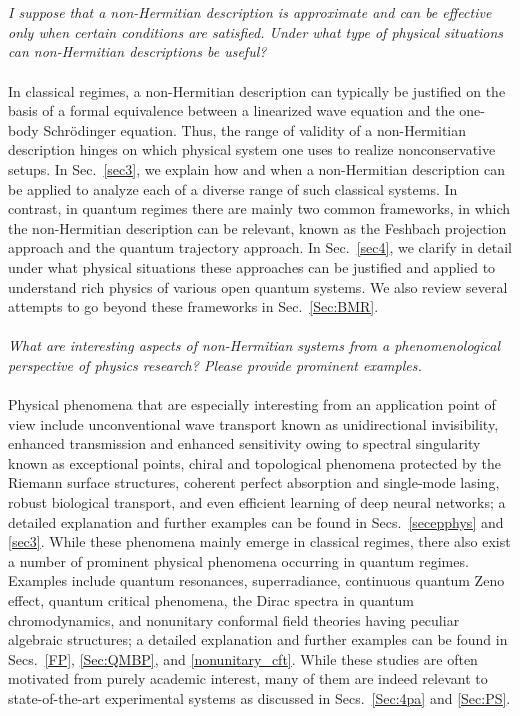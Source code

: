 \documentclass{tADP2e}
\theoremstyle{plain}
\theoremstyle{plain}
\theoremstyle{definition}
\begin{document}
\\
\\
{\it I suppose that a non-Hermitian description is approximate and can be effective only when certain conditions are satisfied. Under what type of physical situations can non-Hermitian descriptions be useful?}
\\
\\
In classical regimes, a non-Hermitian description can typically be justified on the basis of a formal equivalence between a linearized wave equation and the one-body Schr{\"o}dinger equation. Thus, the range of validity of a non-Hermitian description hinges on which physical system one uses to realize nonconservative setups. In Sec.~\ref{sec3}, we explain how and when a non-Hermitian description can be applied to analyze each of a diverse range of such classical systems. In contrast, in quantum regimes there are mainly two common frameworks, in which the non-Hermitian description can be relevant, known as the Feshbach projection approach and the quantum trajectory approach.  In Sec.~\ref{sec4}, we clarify in detail under what physical situations these approaches can be justified and applied to understand rich physics of various open quantum systems. We also review several attempts to go beyond these frameworks in Sec.~\ref{Sec:BMR}.
\\
\\
{\it What  are interesting aspects of non-Hermitian systems from a phenomenological perspective of physics research? Please provide prominent examples.}
\\
\\
Physical phenomena that are especially interesting from an application point of view include unconventional wave transport known as unidirectional invisibility, enhanced transmission and enhanced sensitivity owing to spectral singularity known as exceptional points, chiral and topological phenomena protected by the Riemann surface structures, coherent perfect absorption and single-mode lasing, robust biological transport, and even efficient learning of deep neural networks; a detailed explanation and further examples can be found in Secs.~\ref{secepphys} and \ref{sec3}. 
While these phenomena mainly emerge in classical regimes, there also exist a number of prominent physical phenomena occurring in quantum regimes. Examples include quantum resonances, superradiance, continuous quantum Zeno effect, quantum critical phenomena, the Dirac spectra in quantum chromodynamics, and nonunitary conformal field theories having peculiar algebraic structures; a detailed explanation and further examples can be found in Secs.~\ref{FP}, \ref{Sec:QMBP}, and \ref{nonunitary_cft}.  While these studies are often motivated from purely academic interest, many of them are indeed relevant to state-of-the-art experimental systems as discussed in Secs.~\ref{Sec:4pa}  and \ref{Sec:PS}. 
\end{document}
